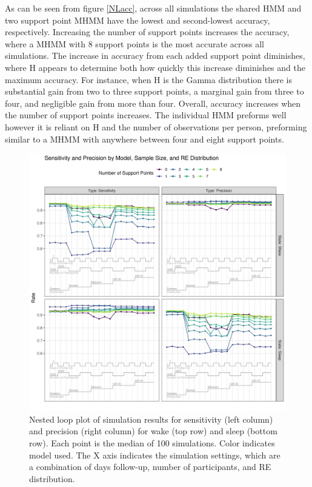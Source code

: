 \documentclass{article}
\begin{document}
As can be seen from figure \ref{NLacc}, across all simulations the shared HMM and two support point MHMM have the lowest and second-lowest accuracy, respectively. Increasing the number of support points increases the accuracy, where a MHMM with 8 support points is the most accurate across all simulations. The increase in accuracy from each added support point diminishes, where H appears to determine both how quickly this increase diminishes and the maximum accuracy. For instance, when H is the Gamma distribution there is substantial gain from two to three support points, a marginal gain from three to four, and negligible gain from more than four. Overall, accuracy increases when the number of support points increases. The individual HMM preforms well however it is reliant on H and the number of observations per person, preforming similar to a MHMM with anywhere between four and eight support points. 
 




\begin{figure}
\includegraphics[scale=.65]{Support/NestedLoopSP.png}
\centering
\caption{Nested loop plot of simulation results for sensitivity (left column) and precision (right column) for wake (top row) and sleep (bottom row). Each point is the median of 100 simulations. Color indicates model used. The X axis indicates the simulation settings, which are a combination of days follow-up, number of participants, and RE distribution.}
\label{NL2}
\end{figure}
\end{document}
